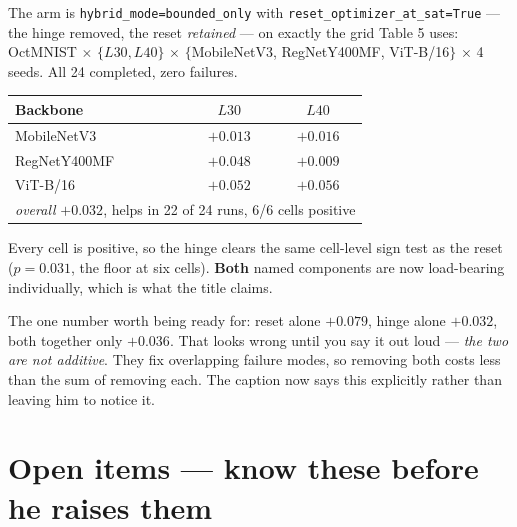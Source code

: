 \documentclass[11pt,a4paper]{article}
\begin{document}
\smallskip
The arm is \texttt{hybrid\_mode=bounded\_only} with \texttt{reset\_optimizer\_at\_sat=True}
--- the hinge removed, the reset \emph{retained} --- on exactly the grid Table 5 uses:
OctMNIST $\times$ $\{L30,L40\}$ $\times$ $\{$MobileNetV3, RegNetY400MF, ViT-B/16$\}$
$\times$ 4 seeds. All 24 completed, zero failures.

\begin{center}\small
\begin{tabular}{lcc}
\toprule
Backbone & $L30$ & $L40$ \\
\midrule
MobileNetV3   & $+0.013$ & $+0.016$ \\
RegNetY400MF  & $+0.048$ & $+0.009$ \\
ViT-B/16      & $+0.052$ & $+0.056$ \\
\midrule
\multicolumn{3}{l}{\emph{overall} $+0.032$, helps in 22 of 24 runs, 6/6 cells positive} \\
\bottomrule
\end{tabular}
\end{center}

\noindent Every cell is positive, so the hinge clears the same cell-level sign test as the
reset ($p{=}0.031$, the floor at six cells). \textbf{Both} named components are now
load-bearing individually, which is what the title claims.

\smallskip
The one number worth being ready for: reset alone $+0.079$, hinge alone $+0.032$, both
together only $+0.036$. That looks wrong until you say it out loud --- \emph{the two are
not additive}. They fix overlapping failure modes, so removing both costs less than the sum
of removing each. The caption now says this explicitly rather than leaving him to notice it.

\section{Open items --- know these before he raises them}
\end{document}
